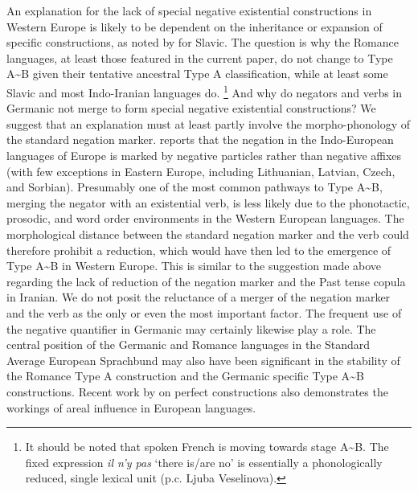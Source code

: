 \documentclass[output=paper]{langsci/langscibook}
\begin{document}
An explanation for the lack of special negative existential constructions
in Western Europe is likely to be dependent on the inheritance or expansion
of specific constructions, as noted by \citet[1330]{Veselinova2014} for
Slavic. The question is why the Romance languages, at least those featured
in the current paper, do not change to Type A{\textasciitilde}B given their
tentative ancestral Type A classification, while at least some Slavic and
most Indo-Iranian languages do.%
%
\footnote{It should be noted that spoken French is moving towards stage
A{\textasciitilde}B. The fixed expression \textit{il n’y
pas} `there is\slash are no' is essentially a phonologically reduced,
single lexical unit (p.c. Ljuba Veselinova).} 
%
And why do negators and verbs in Germanic not merge to form special
negative existential constructions? We suggest that an explanation must at
least partly involve the morpho-phonology of the standard negation marker.
\citet{Dryer2013} reports that the negation in the Indo-European languages
of Europe is marked by negative particles rather than negative affixes
(with few exceptions in Eastern Europe, including Lithuanian, Latvian,
Czech, and Sorbian). Presumably one of the most common pathways to Type
A{\textasciitilde}B, merging the negator with an existential verb, is less
likely due to the phonotactic, prosodic, and word order environments in the
Western European languages. The morphological distance between the standard
negation marker and the verb could therefore prohibit a reduction, which
would have then led to the emergence of Type A{\textasciitilde}B in Western
Europe. This is similar to the suggestion made above regarding the lack of
reduction of the negation marker and the Past tense copula in Iranian. We
do not posit the reluctance of a merger of the negation marker and the verb
as the only or even the most important factor. The frequent use of the
negative quantifier in Germanic may certainly likewise play a role. The
central position of the Germanic and Romance languages in the Standard
Average European Sprachbund \parencite{Auwera2011} may also have been significant in the stability of the Romance Type A construction and the Germanic specific Type A{\textasciitilde}B constructions. Recent work by \citet{Drinka2017} on perfect constructions also demonstrates the workings of areal influence in European languages.  
\end{document}
